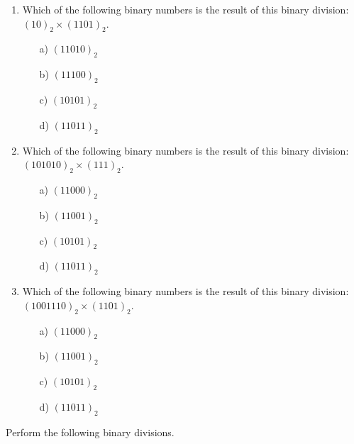 	\begin{enumerate}
		\item Which of the following binary numbers is the result of this binary division: $(10)_{2} \times ( 1101)_{2}$. %
		\begin{multicols}{2}
			\begin{itemize}
				\item[a)] $(11010)_{2}$ %
				\item[b)] $(11100)_{2}$ %
				\item[c)] $(10101)_{2}$ %
				\item[d)] $(11011)_2$ %
			\end{itemize}
		\end{multicols}
		\item Which of the following binary numbers is the result of this binary division: $(101010)_{2} \times( 111 )_{2}$. %
		\begin{multicols}{2}
			\begin{itemize}
				\item[a)] $(11000)_{2}$ %
				\item[b)] $(11001)_{2}$ %
				\item[c)] $(10101)_{2}$ %
				\item[d)] $(11011)_2$ %
			\end{itemize}
		\end{multicols}
		\item Which of the following binary numbers is the result of this binary division: $(1001110)_{2}\times ( 1101 )_{2}$. %
		\begin{multicols}{2}
			\begin{itemize}
				\item[a)] $(11000)_{2}$ %
				\item[b)] $(11001)_{2}$ %
				\item[c)] $(10101)_{2}$ %
				\item[d)] $(11011)_2$ %
			\end{itemize}
		\end{multicols}
	\end{enumerate}
	
	\newpage
	
	\item Perform the following binary divisions.
	

